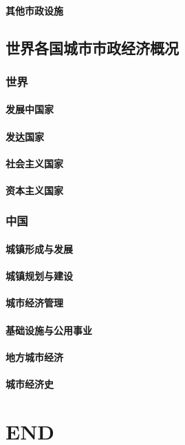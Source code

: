 \documentclass[UTF8]{../../RepresentationUniverse}
\begin{document}
    \subsubsection{其他市政设施}
\section{世界各国城市市政经济概况}
    \subsection{世界}
        \subsubsection{发展中国家}
        \subsubsection{发达国家}
        \subsubsection{社会主义国家}
        \subsubsection{资本主义国家}
    \subsection{中国}
        \subsubsection{城镇形成与发展}
        \subsubsection{城镇规划与建设}
        \subsubsection{城市经济管理}
        \subsubsection{基础设施与公用事业}
        \subsubsection{地方城市经济}
        \subsubsection{城市经济史} 




\chapter{END}
\end{document}
